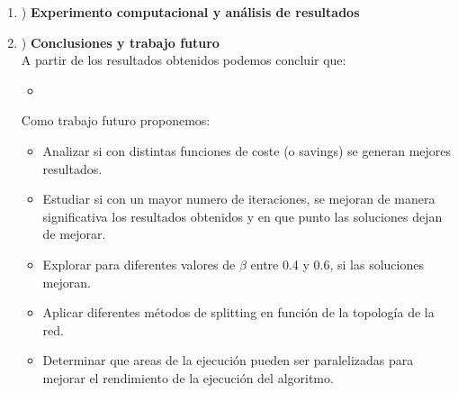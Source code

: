 \documentclass[11pt]{article} %
\begin{document}
\begin{enumerate}
   \item) \textbf{Experimento computacional y análisis de resultados}\\[0.2cm]

   \item) \textbf{Conclusiones y trabajo futuro}\\[0.2cm]

A partir de los resultados obtenidos podemos concluir que:

\begin{itemize}
\item 
\end{itemize}

Como trabajo futuro proponemos: 

\begin{itemize}
\item Analizar si con distintas funciones de coste (o savings) se generan mejores resultados.
\item Estudiar si con un mayor numero de iteraciones, se mejoran de manera significativa los resultados obtenidos y en que punto las soluciones dejan de mejorar.
\item Explorar para diferentes valores de $\beta$ entre 0.4 y 0.6, si las soluciones mejoran.
\item Aplicar diferentes métodos de splitting en función de la topología de la red.
\item Determinar que areas de la ejecución pueden ser paralelizadas para mejorar el rendimiento de la ejecución del algoritmo.
\end{itemize}

 \end{enumerate}
\end{document}
